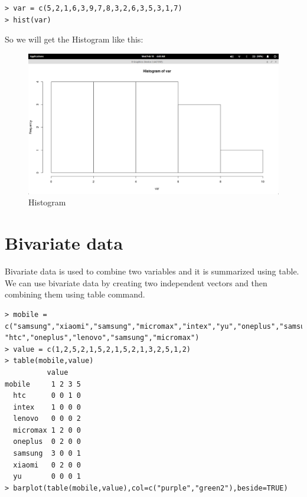 \begin{lstlisting}[frame=single]
> var = c(5,2,1,6,3,9,7,8,3,2,6,3,5,3,1,7)
> hist(var)
\end{lstlisting} 

So we will get the Histogram like this:\\

 
\begin{figure}[h!]
\includegraphics[scale=0.35]{hist_plot.png}
  \centering
  \caption{Histogram}
  \label{fig:barchart1}
\end{figure}

\section{Bivariate data}
Bivariate data is used to combine two variables and it is summarized using table. We can use bivariate data by creating two independent vectors and then combining them using table command.

\begin{lstlisting}[frame=single ]
> mobile = c("samsung","xiaomi","samsung","micromax","intex","yu","oneplus","samsung","lenovo","xiaomi","micromax",
"htc","oneplus","lenovo","samsung","micromax")
> value = c(1,2,5,2,1,5,2,1,5,2,1,3,2,5,1,2)
> table(mobile,value)
          value
mobile     1 2 3 5
  htc      0 0 1 0
  intex    1 0 0 0
  lenovo   0 0 0 2
  micromax 1 2 0 0
  oneplus  0 2 0 0
  samsung  3 0 0 1
  xiaomi   0 2 0 0
  yu       0 0 0 1
> barplot(table(mobile,value),col=c("purple","green2"),beside=TRUE)
\end{lstlisting}

